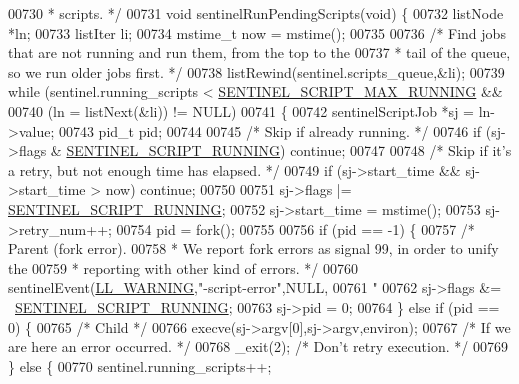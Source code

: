 \begin{DoxyCode}
{{{{{{{{{{00730 \textcolor{comment}{ * scripts. */}
00731 \textcolor{keywordtype}{void} sentinelRunPendingScripts(\textcolor{keywordtype}{void}) \{
00732     listNode *ln;
00733     listIter li;
00734     mstime\_t now = mstime();
00735 
00736     \textcolor{comment}{/* Find jobs that are not running and run them, from the top to the}
00737 \textcolor{comment}{     * tail of the queue, so we run older jobs first. */}
00738     listRewind(sentinel.scripts\_queue,&li);
00739     \textcolor{keywordflow}{while} (sentinel.running\_scripts < \hyperlink{sentinel_8c_ad05484edee559e8cb5e1ac3d72375f20}{SENTINEL\_SCRIPT\_MAX\_RUNNING} &&
00740            (ln = listNext(&li)) != NULL)
00741     \{
00742         sentinelScriptJob *sj = ln->value;
00743         pid\_t pid;
00744 
00745         \textcolor{comment}{/* Skip if already running. */}
00746         \textcolor{keywordflow}{if} (sj->flags & \hyperlink{sentinel_8c_a0211d42099c07769ec06cc0010f9b58e}{SENTINEL\_SCRIPT\_RUNNING}) \textcolor{keywordflow}{continue};
00747 
00748         \textcolor{comment}{/* Skip if it's a retry, but not enough time has elapsed. */}
00749         \textcolor{keywordflow}{if} (sj->start\_time && sj->start\_time > now) \textcolor{keywordflow}{continue};
00750 
00751         sj->flags |= \hyperlink{sentinel_8c_a0211d42099c07769ec06cc0010f9b58e}{SENTINEL\_SCRIPT\_RUNNING};
00752         sj->start\_time = mstime();
00753         sj->retry\_num++;
00754         pid = fork();
00755 
00756         \textcolor{keywordflow}{if} (pid == -1) \{
00757             \textcolor{comment}{/* Parent (fork error).}
00758 \textcolor{comment}{             * We report fork errors as signal 99, in order to unify the}
00759 \textcolor{comment}{             * reporting with other kind of errors. */}
00760             sentinelEvent(\hyperlink{server_8h_a31229b9334bba7d6be2a72970967a14b}{LL\_WARNING},\textcolor{stringliteral}{"-script-error"},NULL,
00761                           \textcolor{stringliteral}{"%
00762             sj->flags &= ~\hyperlink{sentinel_8c_a0211d42099c07769ec06cc0010f9b58e}{SENTINEL\_SCRIPT\_RUNNING};
00763             sj->pid = 0;
00764         \} \textcolor{keywordflow}{else} \textcolor{keywordflow}{if} (pid == 0) \{
00765             \textcolor{comment}{/* Child */}
00766             execve(sj->argv[0],sj->argv,environ);
00767             \textcolor{comment}{/* If we are here an error occurred. */}
00768             \_exit(2); \textcolor{comment}{/* Don't retry execution. */}
00769         \} \textcolor{keywordflow}{else} \{
00770             sentinel.running\_scripts++;
}}}}}}}}}}}
\end{DoxyCode}

